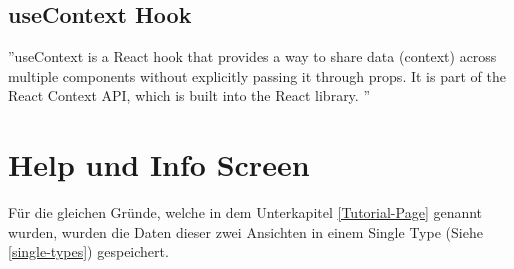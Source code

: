 \subsection{useContext Hook}
''useContext is a React hook that provides a way to share data (context)
across multiple components without explicitly passing it through props.
It is part of the React Context API, which is built into the React library.
'' \cite{useContext}






\section{Help und Info Screen}

Für die gleichen Gründe, welche in dem Unterkapitel \ref{Tutorial-Page} genannt wurden, wurden die Daten dieser zwei Ansichten in einem Single Type (Siehe  \ref{single-types}) gespeichert.


